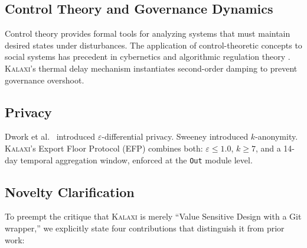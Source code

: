 \documentclass[12pt,a4paper]{article}
\theoremstyle{definition}
\theoremstyle{remark}
\newcommand{\kalaxi}{\textsc{Kalaxi}}
\begin{document}
\subsection{Control Theory and Governance Dynamics}

Control theory \cite{astrom2021} provides formal tools for analyzing systems that must
maintain desired states under disturbances. The application of control-theoretic
concepts to social systems has precedent in cybernetics \cite{wiener1961} and
algorithmic regulation theory \cite{baldwin2012}. \kalaxi{}'s thermal delay mechanism
instantiates second-order damping to prevent governance overshoot.

\subsection{Privacy}

Dwork et al.\ \cite{dwork2006} introduced $\varepsilon$-differential privacy.
Sweeney \cite{sweeney2002} introduced $k$-anonymity. \kalaxi{}'s Export Floor Protocol
(EFP) combines both: $\varepsilon \leq 1.0$, $k \geq 7$, and a 14-day temporal
aggregation window, enforced at the \texttt{Out} module level.

\subsection{Novelty Clarification}
\label{sec:novelty}

To preempt the critique that \kalaxi{} is merely ``Value Sensitive Design with a Git
wrapper,'' we explicitly state four contributions that distinguish it from prior work:
\end{document}
